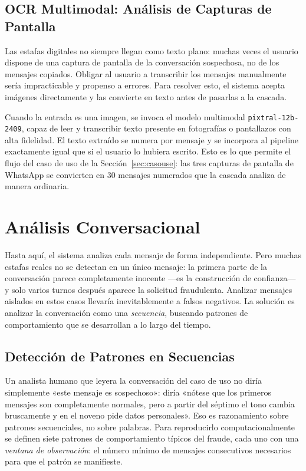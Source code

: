 \documentclass{llncs}
\begin{document}
\subsection{OCR Multimodal: Análisis de Capturas de Pantalla}
\label{sec:llm:ocr}

Las estafas digitales no siempre llegan como texto plano:
muchas veces el usuario dispone de una captura de pantalla de
la conversación sospechosa, no de los mensajes copiados.
Obligar al usuario a transcribir los mensajes manualmente
sería impracticable y propenso a errores.
Para resolver esto, el sistema acepta imágenes directamente
y las convierte en texto antes de pasarlas a la cascada.

Cuando la entrada es una imagen, se invoca el modelo multimodal
\texttt{pixtral-12b-2409}, capaz de leer y transcribir texto
presente en fotografías o pantallazos con alta fidelidad.
El texto extraído se numera por mensaje y se incorpora al
pipeline exactamente igual que si el usuario lo hubiera escrito.
Esto es lo que permite el flujo del caso de uso de la
Sección~\ref{sec:casouse}: las tres capturas de pantalla de
WhatsApp se convierten en 30 mensajes numerados que la cascada
analiza de manera ordinaria.

\section{Análisis Conversacional}
\label{sec:conv}

Hasta aquí, el sistema analiza cada mensaje de forma independiente.
Pero muchas estafas reales no se detectan en un único mensaje:
la primera parte de la conversación parece completamente inocente
—es la construcción de confianza— y solo varios turnos después
aparece la solicitud fraudulenta.
Analizar mensajes aislados en estos casos llevaría inevitablemente
a falsos negativos.
La solución es analizar la conversación como una \emph{secuencia},
buscando patrones de comportamiento que se desarrollan a lo largo
del tiempo.

\subsection{Detección de Patrones en Secuencias}
\label{sec:conv:patterns}

Un analista humano que leyera la conversación del caso de uso
no diría simplemente «este mensaje es sospechoso»:
diría «nótese que los primeros mensajes son completamente
normales, pero a partir del séptimo el tono cambia bruscamente
y en el noveno pide datos personales».
Eso es razonamiento sobre patrones secuenciales, no sobre palabras.
Para reproducirlo computacionalmente se definen siete patrones
de comportamiento típicos del fraude, cada uno con una
\emph{ventana de observación}: el número mínimo de mensajes
consecutivos necesarios para que el patrón se manifieste.
\end{document}
